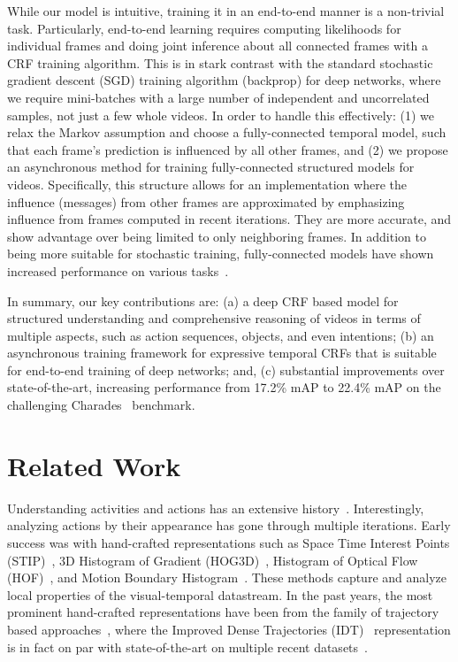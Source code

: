 \documentclass[10pt,twocolumn,letterpaper]{article}
\begin{document}
While our model is intuitive, training it in an end-to-end manner is a non-trivial task. Particularly, end-to-end learning requires computing likelihoods for individual frames and doing joint inference about all connected frames with a CRF training algorithm. 
This is in stark contrast with the standard stochastic gradient descent (SGD) training algorithm (backprop) for deep networks, where we require mini-batches with a large number of independent and uncorrelated samples, not just a few whole videos.
In order to handle this effectively: (1) we relax the Markov assumption and choose a fully-connected temporal model, such that each frame's prediction is influenced by all other frames, and (2) we propose an asynchronous method for training fully-connected structured models for videos. Specifically, this structure allows for an implementation where the influence (messages) from other frames are approximated by emphasizing influence from frames computed in recent iterations. They are more accurate, and show advantage over being limited to only neighboring frames. In addition to being more suitable for stochastic training, fully-connected models have shown increased performance on various tasks~\cite{densecrfsegmentation,raqueldense2016}.

In summary, our key contributions are: (a) a deep CRF based model for structured understanding and comprehensive reasoning of videos in terms of multiple aspects, such as action sequences, objects, and even intentions; (b) an asynchronous training framework for expressive temporal CRFs that is suitable for end-to-end training of deep networks; and, (c) substantial improvements over state-of-the-art, increasing performance from 17.2\% mAP to 22.4\% mAP on the challenging Charades~\cite{charades} benchmark.

\section{Related Work} 

Understanding activities and actions has an extensive history~\cite{poppe2010survey,weinland2011survey,STIP05,HOG3D,HOF,MBH06,Matikainen09,WangIDT13,Peng14,Lan15}. Interestingly, 
analyzing actions by their appearance has gone through multiple iterations. Early success was with hand-crafted representations such as Space Time Interest Points (STIP)~\cite{STIP05}, 3D Histogram of Gradient (HOG3D)~\cite{HOG3D}, Histogram of Optical Flow (HOF)~\cite{HOF}, and Motion Boundary Histogram~\cite{MBH06}. These methods capture and analyze local properties of the visual-temporal datastream. In the past years, the most prominent hand-crafted representations have been from the family of trajectory based approaches~\cite{Matikainen09,WangIDT13,Peng14,Lan15}, where the Improved Dense Trajectories (IDT)~\cite{WangIDT13} representation is in fact on par with state-of-the-art on multiple recent datasets~\cite{THUMOS15,charades}. 
\end{document}
